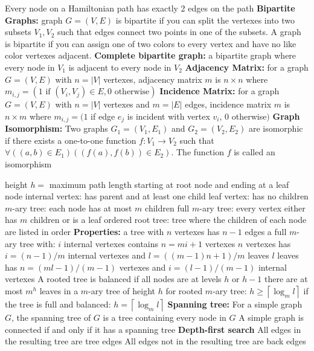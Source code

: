\documentclass{article}
\newcommand{\upspace}{\vspace{0px}}
\newcommand{\bksp}{\hspace{-3px}}
\newcommand{\zzz}[1]{\upspace \0\bksp{\large\textbf{#1:}}\addcontentsline{toc}{subsection}{#1}}
\newcommand{\aaa}{\upspace \1\bksp}
\newcommand{\bbb}{\upspace \2\bksp}
\newcommand{\ceil}[1]{\left\lceil #1 \right\rceil}
\newcommand{\tbf}[1]{\textbf{#1}}
\begin{document}
\begin{multicols*}{2}
\begin{outline}[compactitem]
	\aaa Every node on a Hamiltonian path has exactly 2 edges on the path
\0\tbf{Bipartite Graphs:}
	\aaa graph $G = (V,E)$ is bipartite if you can split the vertexes into two subsets $V_1,V_2$ such that edges connect two points in one of the subsets. A graph is bipartite if you can assign one of two colors to every vertex and have no like color vertexes adjacent.
\0\tbf{Complete bipartite graph:} 
	\aaa a bipartite graph where every node in $V_1$ is adjacent to every node in $V_2$
\0\tbf{Adjacency Matrix:} 
	\aaa for a graph $G = (V,E)$ with $n=|V|$ vertexes, adjacency matrix $m$ is $n\times n$ where
 $m_{i,j} = ( 1\mbox{ if }(V_i,V_j) \in E, 0 \mbox{ otherwise})$
\0\tbf{Incidence Matrix:}
	\aaa for a graph $G = (V,E)$ with $n=|V|$ vertexes and $m=|E|$ edges, incidence matrix $m$ is $n\times m$ where $m_{i,j} = ( 1$ if edge $e_j$ is incident with vertex $v_i$, $0$ otherwise$)$
\0\tbf{Graph Isomorphism:} 
	\aaa Two graphs $G_1 = (V_1,E_1)$ and $G_2 = (V_2,E_2)$ are isomorphic if there exists a one-to-one function $f: V_1 \rightarrow V_2$ such that $\forall ((a,b) \in E_1) ((f(a),f(b))\in E_2 )$. The function $f$ is called an isomorphism
\\
\zzz{Trees}
	\aaa height $h =$ maximum path length starting at root node and ending at a leaf node
	\aaa internal vertex: has parent and at least one child
	\aaa leaf vertex: has no children
	\aaa $m$-ary tree: each node has at most $m$ children
	\aaa full $m$-ary tree: every vertex either has $m$ children or is a leaf
	\aaa ordered root tree: tree where the children of each node are listed in order
\0 \tbf{Properties:}
	\aaa a tree with $n$ vertexes has $n-1$ edges
	\aaa a full $m$-ary tree with:
		\bbb $i$ internal vertexes contains $n=mi+1$ vertexes
		\bbb $n$ vertexes has $i = (n-1)/m$ internal vertexes and $l=\left((m-1)n+1\right)/m$ leaves
		\bbb $l$ leaves has $n=(ml-1)/(m-1)$ vertexes and $i=(l-1)/(m-1)$ internal vertexes
	\aaa A rooted tree is balanced if all nodes are at levels $h$ or $h-1$
	\aaa there are at most $m^h$ leaves in a $m$-ary tree of height $h$
	\aaa for rooted $m$-ary tree:
		\bbb $h \geq \ceil{\log_m l}$
		\bbb if the tree is full and balanced: $h = \ceil{\log_m l}$
\0 \tbf{Spanning tree:}
	\aaa For a simple graph $G$, the spanning tree of $G$ is a tree containing every node in $G$
	\aaa A simple graph is connected if and only if it has a spanning tree
\0\tbf{Depth-first search}
	\aaa All edges in the resulting tree are tree edges
	\aaa All edges not in the resulting tree are back edges

\end{outline}
\end{multicols*}
\end{document}
